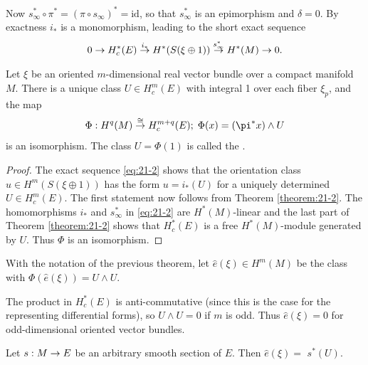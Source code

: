 Now ${s}_{\infty }^* \circ  {\pi }^* = {( \pi  \circ  {s}_{\infty }) }^* = \mathrm{{id}}$, so that ${s}_{\infty }^*$ 
is an epimorphism and $\delta  = 0$. By exactness ${i}_{ * }$ is a monomorphism, leading to the short exact sequence
\begin{align}\label{eq:21-2}
  0 \rightarrow  H_c^*( E) \overset{{i}_{ * }}
  { \rightarrow  } H^*( {S( {\xi  \oplus  1}) }) 
  \overset{{s}_{\infty }^*}
  { \rightarrow  } H^*(M) \rightarrow  0.
\end{align}


\begin{theorem}\label{theorem:21-3}
  Let $\xi$ be an oriented $m$-dimensional real vector bundle over a compact manifold $M$. There 
  is a unique class $U \in  H_c^{m}( E)$ with integral 1 over each fiber ${\xi }_{p}$, and the map
  \[
    \Phi  : {H}^{q}( M) \overset{ \cong  }{ \ra  }H_c^{m + q}( E) ;\;\Phi ( x)  = ( {{\pi }^*x})  \land  U
  \]
  is an isomorphism. The class $U = \Phi ( 1)$ is called the .
\end{theorem}

\begin{proof}
  The exact sequence \eqref{eq:21-2} shows that the orientation class $u \in  H^m( {S( {\xi  \oplus  1}) })$ 
  has the form $u = {i}_{ * }( U)$ for a uniquely determined $U \in  H_c^{m}( E)$. The first statement now follows 
  from Theorem \ref{theorem:21-2}. The homomorphisms ${i}_{ * }$ and ${s}_{\infty }^*$ in \eqref{eq:21-2} 
  are ${H}^*( M)$-linear and the last part of Theorem \ref{theorem:21-2} shows that $H_c^*( E)$ is a free ${H}^*( M)$-module 
  generated by $U$. Thus $\Phi$ is an isomorphism.
\end{proof}

\begin{definition}\label{definition:21-4}
  With the notation of the previous theorem, let $\hat{e}( \xi )  \in  H^m( M)$ be the class 
  with $\Phi({\hat{e}( \xi ) }) = U \land  U$.
\end{definition}


The product in $H_c^*( E)$ is anti-commutative (since this is the case for the representing differential forms), 
so $U \land  U = 0$ if $m$ is odd. Thus $\hat{e}( \xi )  = 0$ for odd-dimensional oriented vector bundles.

\begin{lemma}\label{lemma:21-5}
  Let $s : M \rightarrow  E$ be an arbitrary smooth section of $E$. Then $\hat{e}( \xi )  =$  ${s}^*( U)$.
\end{lemma}


